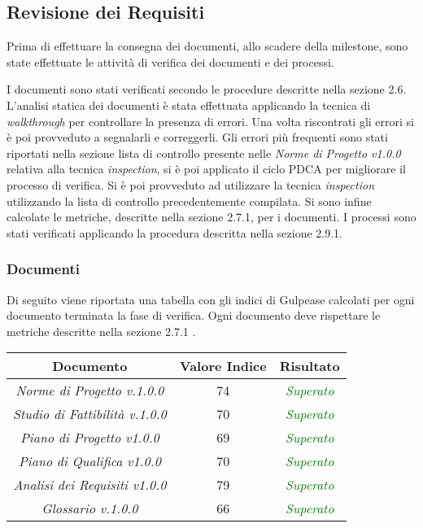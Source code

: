 \subsection{Revisione dei Requisiti}

Prima di effettuare la consegna dei documenti, allo scadere della \gls{milestone}, sono state effettuate le attività di verifica dei documenti e dei processi.

\noindent I documenti sono stati verificati secondo le procedure descritte nella sezione 2.6.
L'analisi statica dei documenti è stata effettuata applicando la tecnica di \textit{\gls{walkthrough}} per controllare la presenza di errori. Una volta riscontrati gli errori si è poi provveduto a segnalarli e correggerli. Gli errori più frequenti sono stati riportati nella sezione lista di controllo presente nelle \textit{Norme di Progetto v1.0.0} relativa alla tecnica \textit{\gls{inspection}}, si è poi applicato il ciclo \gls{PDCA} per migliorare il processo di verifica. Si è poi provveduto ad utilizzare la tecnica \textit{\gls{inspection}} utilizzando la lista di controllo precedentemente compilata. Si sono infine calcolate le metriche, descritte nella sezione 2.7.1, per i documenti. I processi sono stati verificati applicando la procedura descritta nella sezione 2.9.1.

\subsubsection{Documenti}

Di seguito viene riportata una tabella con gli indici di Gulpease calcolati per ogni documento terminata la fase di verifica. Ogni documento deve rispettare le metriche descritte nella sezione 2.7.1 .\\

\hspace{1cm}

\begin{center}
\begin{tabular}{|c|c|c|}
\hline 
\textbf{Documento} & \textbf{Valore Indice} & \textbf{Risultato} \\ 
\hline
\textit{Norme di Progetto v.1.0.0} & 74 & \textcolor{green}{\textit{Superato}} \\ 
\textit{Studio di Fattibilità v.1.0.0} & 70 & \textcolor{green}{\textit{Superato}} \\ 
\textit{Piano di Progetto v1.0.0} & 69 & \textcolor{green}{\textit{Superato}} \\ 
\textit{Piano di Qualifica v1.0.0} & 70 & \textcolor{green}{\textit{Superato}} \\ 
\textit{Analisi dei Requisiti v1.0.0} & 79 & \textcolor{green}{\textit{Superato}} \\ 
\textit{Glossario v.1.0.0} & 66 & \textcolor{green}{\textit{Superato}} \\ 
\hline 
\end{tabular}

\end{center}


